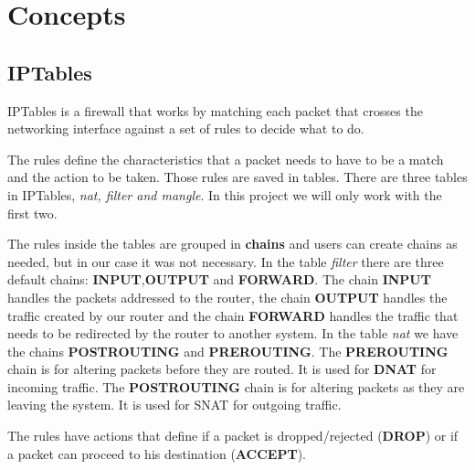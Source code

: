 \documentclass{article}
\begin{document}
\section{Concepts}
\subsection{IPTables}
\texttt{}\par
IPTables is a firewall that works by matching each packet that crosses the networking interface against a set of rules to decide what to do.\par
The rules define the characteristics that a packet needs to have to be a match and the action to be taken.
Those rules are saved in tables. There are three tables in IPTables, \textit{nat, filter and mangle}. In this project we will only work with the first two.\par
The rules inside the tables are grouped in \textbf{chains} and users can create chains as needed, but in our case it was not necessary. In the table \textit{filter} there are three default chains: \textbf{INPUT},\textbf{OUTPUT} and \textbf{FORWARD}. The chain \textbf{INPUT} handles the packets addressed to the router, the chain \textbf{OUTPUT} handles the traffic created by our router and the chain \textbf{FORWARD} handles the traffic that needs to be redirected by the router to another system. In the table \textit{nat} we have the chains \textbf{POSTROUTING} and \textbf{PREROUTING}. The \textbf{PREROUTING} chain is for altering packets before they are routed. It is used for \textbf{DNAT} for incoming traffic. The \textbf{POSTROUTING} chain is for altering packets as they are leaving the system. It is used for SNAT for outgoing traffic.\par
The rules have actions that define if a packet is dropped/rejected (\textbf{DROP}) or if a packet can proceed to his destination (\textbf{ACCEPT}).
\end{document}
